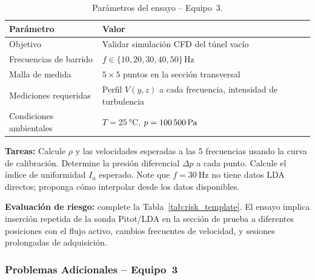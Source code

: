 \documentclass[12pt,a4paper]{article}
\begin{document}
\begin{table}[H]
	\centering
	\caption{Parámetros del ensayo -- Equipo~3.}
	\small
	\begin{tabular}{l l}
		\toprule
		\textbf{Parámetro}      & \textbf{Valor}                              \\
		\midrule
		Objetivo                & Validar simulación CFD del túnel vacío      \\
		Frecuencias de barrido  & $f \in \{10, 20, 30, 40, 50\}\,\si{\Hz}$    \\
		Malla de medida         & $5\times5$ puntos en la sección transversal \\
		Mediciones requeridas   & Perfil $V(y,z)$ a cada frecuencia,
		intensidad de turbulencia                                             \\
		\rowcolor{aeroyellow!20}
		Condiciones ambientales & $T = \SI{25}{\degreeCelsius}$,
		$p = \SI{100\,500}{\pascal}$                                          \\
		\bottomrule
	\end{tabular}
\end{table}

\textbf{Tareas:} Calcule $\rho$ y las velocidades esperadas a las 5
frecuencias usando la curva de calibración.  Determine la presión diferencial
$\Delta p$ a cada punto.  Calcule el índice de uniformidad $I_u$ esperado.
Note que $f = \SI{30}{\Hz}$ no tiene datos LDA directos; proponga cómo
interpolar desde los datos disponibles.

\textbf{Evaluación de riesgo:} complete la Tabla~\ref{tab:risk_template}.
El ensayo implica inserción repetida de la sonda Pitot/LDA en la sección de
prueba a diferentes posiciones con el flujo activo, cambios frecuentes de
velocidad, y sesiones prolongadas de adquisición.

\subsubsection*{Problemas Adicionales -- Equipo~3}
\end{document}

